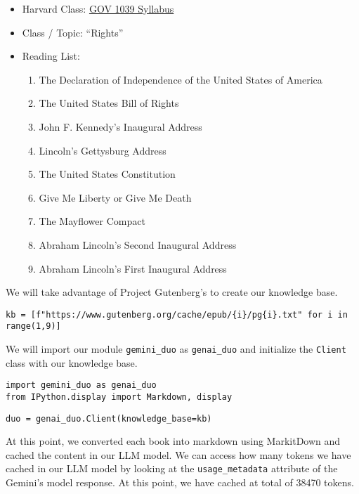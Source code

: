 \begin{itemize}
\item Harvard Class: \href{https://scholar.harvard.edu/files/dlcammack/files/gov_1039_syllabus.pdf}{GOV 1039 Syllabus}
\item Class / Topic: ``Rights''
\item Reading List:
  \begin{enumerate}
  \item The Declaration of Independence of the United States of America
  \item The United States Bill of Rights  
  \item John F. Kennedy's Inaugural Address
  \item Lincoln's Gettysburg Address
  \item The United States Constitution
  \item Give Me Liberty or Give Me Death
  \item The Mayflower Compact
  \item Abraham Lincoln's Second Inaugural Address
  \item Abraham Lincoln's First Inaugural Address
  \end{enumerate}
\end{itemize}

We will take advantage of Project Gutenberg's to create our knowledge base.

\begin{verbatim}
kb = [f"https://www.gutenberg.org/cache/epub/{i}/pg{i}.txt" for i in range(1,9)]
\end{verbatim}

We will import our module \texttt{gemini\_duo} as \texttt{genai\_duo} and initialize the \texttt{Client} class with our knowledge base.

\begin{verbatim}
import gemini_duo as genai_duo
from IPython.display import Markdown, display
\end{verbatim}

\begin{verbatim}
duo = genai_duo.Client(knowledge_base=kb)
\end{verbatim}

At this point, we converted each book into markdown using MarkitDown and cached the content in our LLM model. We can access how many tokens we have cached in our LLM model by looking at the \texttt{usage\_metadata} attribute of the Gemini's model response. At this point, we have cached at total of 38470 tokens.

